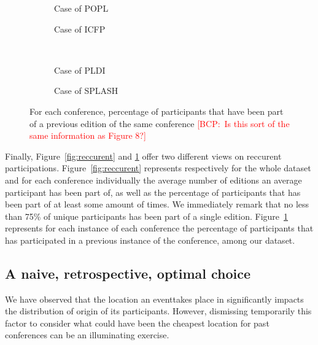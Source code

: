 \documentclass{scrartcl}
\newcommand{\bcp}[1]{\textcolor{red}{{[BCP:~#1]}}}
\newcommand{\bcp}[1]{}
\newcommand{\event}{event} %
\begin{document}
\begin{figure}
  \centering
  \begin{subfigure}[b]{0.4\textwidth}
    \centering
    \caption{Case of POPL}
  \end{subfigure}
  \begin{subfigure}[b]{0.4\textwidth}
    \centering
    \caption{Case of ICFP}
  \end{subfigure}
  \\
  \begin{subfigure}[b]{0.4\textwidth}
    \centering
    \caption{Case of PLDI}
  \end{subfigure}
  \begin{subfigure}[b]{0.4\textwidth}
    \centering
    \caption{Case of SPLASH}
  \end{subfigure}
  \caption{For each conference, percentage of participants that have been
    part of a previous edition of the same conference \bcp{Is this sort of
      the same information as Figure 8?}}
  \label{fig:old-timers}
\end{figure}

Finally, Figure~\ref{fig:reccurent} and \ref{fig:old-timers} offer two different views on reccurent participations. Figure~\ref{fig:reccurent} represents respectively for the whole dataset and for each conference individually the average number of editions an average participant has been part of, as well as the percentage of participants that has been part of at least some amount of times. We immediately remark that no less than 75\% of unique participants has been part of a single edition.
Figure~\ref{fig:old-timers} represents for each instance of each conference the percentage of participants that has participated in a previous instance of the conference, among our dataset.

\subsection{A naive, retrospective, optimal choice}

We have observed that the location an \event takes place in significantly
impacts the distribution of origin of its participants. However, dismissing
temporarily this factor to consider what could have been the cheapest location
for past conferences can be an illuminating exercise.
\end{document}
